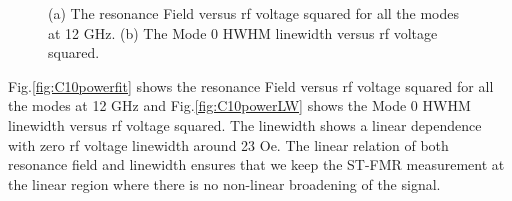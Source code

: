 \begin{figure}[!ht]
\centering
{}
\caption{(a) The resonance Field versus rf voltage squared  for all the modes at 12 GHz. (b) The Mode 0 HWHM linewidth versus rf voltage squared.}
\end{figure}

Fig.\ref{fig:C10powerfit} shows the resonance Field versus rf voltage squared  for all the modes at 12 GHz and Fig.\ref{fig:C10powerLW} shows the Mode 0 HWHM linewidth versus rf voltage squared. The linewidth shows a linear dependence with zero rf voltage linewidth around 23 Oe. The linear relation of both resonance field and linewidth ensures that we keep the ST-FMR measurement at the linear region where there is no non-linear broadening of the signal.
 
